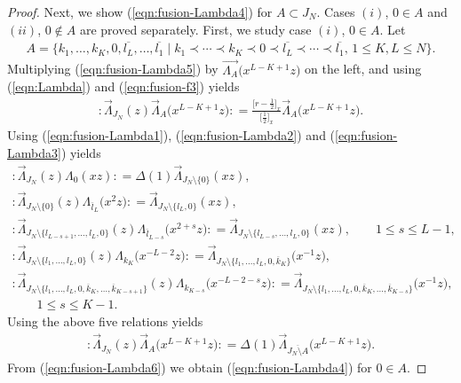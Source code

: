 \documentclass[10pt,a4paper]{amsart}
\numberwithin{equation}{section}
\begin{document}
\begin{proof}
Next, we show (\ref{eqn:fusion-Lambda4}) for $A \subset J_N$.
Cases $(i)$, $0 \in A$ and~$(ii)$, $0 \notin A$ are proved separately.
First, we study case $(i)$, $0 \in A$. Let
\begin{gather*}
A=\{k_1, \dots,k_K, 0, \overline{l_L}, \dots, \overline{l_1} \mid
k_1\prec \cdots \prec k_K \prec 0 \prec\overline{l_L} \prec \cdots \prec \overline{l_1},\,
1\leq K, L \leq N\}.
\end{gather*}
Multiplying (\ref{eqn:fusion-Lambda5}) by $\overrightarrow{\Lambda_A}\big(x^{L-K+1}z\big)$
on the left, and using (\ref{eqn:Lambda}) and (\ref{eqn:fusion-f3}) yields
\begin{gather}
{:}\overrightarrow{\Lambda}_{J_N}(z)
\overrightarrow{\Lambda}_A\big(x^{L-K+1}z\big){:}=\frac{\big[r-\frac{1}{2}\big]_x}{\big[\frac{1}{2}\big]_x}
\overrightarrow{\Lambda}_A\big(x^{L-K+1}z\big).
\label{eqn:fusion-Lambda6}
\end{gather}
Using (\ref{eqn:fusion-Lambda1}), (\ref{eqn:fusion-Lambda2}) and
(\ref{eqn:fusion-Lambda3}) yields
\begin{gather*}
{:}\overrightarrow{\Lambda}_{J_N}(z)\Lambda_0(xz){:}
=\Delta(1)\overrightarrow{\Lambda}_{J_N{\setminus} \{0\}}(xz),
\\
{:}\overrightarrow{\Lambda}_{J_N{\setminus} \{0\}}(z)
\Lambda_{\overline{l}_L}\big(x^2z\big){:}
=\overrightarrow{\Lambda}_{J_N{\setminus} \{l_L, 0\}}(xz),
\\
{:}\overrightarrow{\Lambda}_{J_N{\setminus} \{l_{L-s+1},\dots, l_{L}, 0\}}(z)
\Lambda_{\overline{l}_{L-s}}\big(x^{2+s}z\big){:}
=\overrightarrow{\Lambda}_{J_N{\setminus} \{l_{L-s},\dots, l_L, 0\}}(xz),\qquad
1\leq s \leq L-1,
\\
{:}\overrightarrow{\Lambda}_{J_N{\setminus} \{l_1, \dots, l_L, 0\}}(z)
\Lambda_{{k}_K}\big(x^{-L-2}z\big){:}
=\overrightarrow{\Lambda}_{J_N{\setminus} \{l_1,\dots, l_L, 0, \overline{k}_K\}}\big(x^{-1}z\big),
\\
{:}\overrightarrow{\Lambda}_{J_N{\setminus} \{l_1,\dots, l_{L}, 0, \overline{k}_K, \dots, \overline{k}_{K-s+1}\}}(z)
\Lambda_{{k}_{K-s}}\big(x^{-L-2-s}z\big){:}
=\overrightarrow{\Lambda}_{J_N{\setminus} \{l_{1},\dots, l_L, 0, \overline{k}_K,\dots, \overline{k}_{K-s}\}}\big(x^{-1}z\big),
\\ \qquad
1\leq s \leq K-1.
\end{gather*}
Using the above five relations yields
\begin{gather*}
{:}\overrightarrow{\Lambda}_{J_N}(z)\overrightarrow{\Lambda}_A\big(x^{L-K+1}z\big){:}=
\Delta(1)\overrightarrow{\Lambda}_{\overline{J_N \setminus A}}\big(x^{L-K+1}z\big).
\end{gather*}
From (\ref{eqn:fusion-Lambda6})
we obtain (\ref{eqn:fusion-Lambda4}) for $0 \in A$.


\end{proof}
\end{document}
